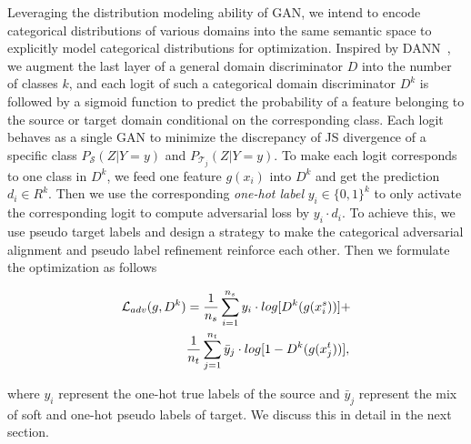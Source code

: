 \documentclass[letterpaper]{article} \usepackage{aaai23}  \usepackage{times}  \usepackage{helvet}  \usepackage{courier}  \usepackage[hyphens]{url}  \usepackage{graphicx} \urlstyle{rm} \def\UrlFont{\rm}  \usepackage{natbib}  \usepackage{caption} \frenchspacing  \setlength{\pdfpagewidth}{8.5in}  \setlength{\pdfpageheight}{11in}
\begin{document}
Leveraging the distribution modeling ability of GAN, we intend to encode categorical distributions of various domains into the same semantic space to explicitly model categorical distributions for optimization. Inspired by DANN~\cite{ganin2015unsupervised}, we augment the last layer of a general domain discriminator $D$ into the number of classes $k$, and each logit of such a categorical domain discriminator $D^k$ is followed by a sigmoid function to predict the probability of a feature belonging to the source or target domain conditional on the corresponding class. Each logit behaves as a single GAN to minimize the discrepancy of JS divergence of a specific class $P_\mathcal{S}(Z | Y=y)$ and $P_{\mathcal{T}_j}(Z | Y=y)$. To make each logit corresponds to one class in $D^k$, we feed one feature $g(x_i)$ into $D^k$ and get the prediction $d_i \in R^k$. Then we use the corresponding \textit{one-hot label} $y_i \in \{0,1\}^k$ to only activate the corresponding logit to compute adversarial loss by $y_i\cdot d_i$. To achieve this, we use pseudo target labels and design a strategy to make the categorical adversarial alignment and pseudo label refinement reinforce each other. Then we formulate the optimization as follows
\begin{small}
\begin{equation}
\setlength{\abovedisplayskip}{2pt}
\setlength{\belowdisplayskip}{2pt}
\begin{split}
\mathcal{L}_{adv}(g,D^k) & = \frac{1}{n_s} \sum_{i=1}^{n_s} y_i \cdot log[D^k(g(x_i^s))] + \\
    & \frac{1}{n_t} \sum_{j=1}^{n_t} \bar{y}_j \cdot log[1-D^k(g(x_j^t))],
\end{split}
\end{equation}
\end{small}
where $y_i$ represent the one-hot true labels of the source and $\bar{y}_j$ represent the mix of soft and one-hot pseudo labels of target. We discuss this in detail in the next section.
\end{document}
